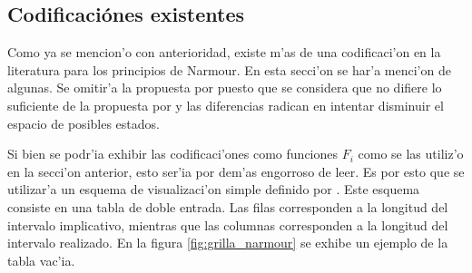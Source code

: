 \begin{imagen}
    \width{10cm}
\end{imagen}

\begin{imagen}
    \width{10cm}
\end{imagen}

\begin{imagen}
    \width{10cm}
\end{imagen}
\clearpage
\subsection{Codificaci\'ones existentes}
Como ya se mencion'o con anterioridad, existe m'as de una codificaci'on en la literatura para los principios de Narmour. 
En esta secci'on se har'a menci'on de algunas. Se omitir'a la propuesta por \cite{PaieThesis}
puesto que se considera que no difiere lo suficiente de la propuesta por \cite{Schellenberg97} y las diferencias radican en intentar disminuir
el espacio de posibles estados.


Si bien se podr'ia exhibir las codificaci'ones como funciones $F_i$ como se las utiliz'o en la secci'on anterior, esto ser'ia por dem'as engorroso de leer.
Es por esto que se utilizar'a un esquema de visualizaci'on simple definido por \cite{Narmour90}. Este esquema consiste en una tabla de doble entrada. 
Las filas corresponden a la longitud del intervalo implicativo, mientras que las columnas corresponden a la longitud del intervalo realizado.
En la figura \ref{fig:grilla_narmour} se exhibe un ejemplo de la tabla vac'ia.

\begin{imagen}
    \width{14cm}
\end{imagen}

